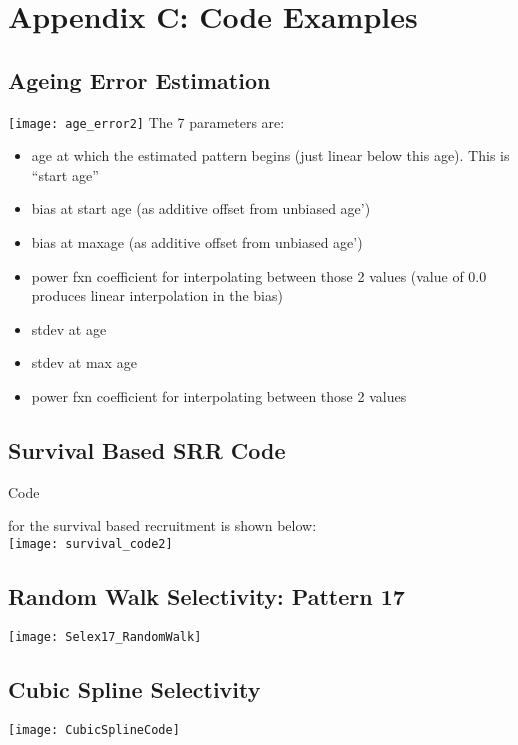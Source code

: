 \section{Appendix C: Code Examples}

\subsection{Ageing Error Estimation}
\hypertarget{AgeingError}{}
\texttt{[image: age\_error2]}
The 7 parameters are:

\begin{itemize}
	\item age at which the estimated pattern begins (just linear below this age).  This is “start age”
	\item bias at start age (as additive offset from unbiased age’)
	\item bias at maxage (as additive offset from unbiased age’)
	\item power fxn coefficient for interpolating between those 2 values (value of 0.0 produces linear interpolation in the bias)
	\item stdev at age
	\item stdev at max age
	\item power fxn coefficient for interpolating between those 2 values
\end{itemize}


\subsection{Survival Based SRR Code}
\hypertarget{AppendixC}{Code} for the survival based recruitment is shown below:\\
\texttt{[image: survival\_code2]}

\subsection{Random Walk Selectivity: Pattern 17}
\hypertarget{RandWalkSelex}{}
	\begin{center}
		\texttt{[image: Selex17\_RandomWalk]}
		\end{center}

\subsection{Cubic Spline Selectivity}
\hypertarget{CubicSpline}{}
	\begin{center}
		\texttt{[image: CubicSplineCode]}
	\end{center}